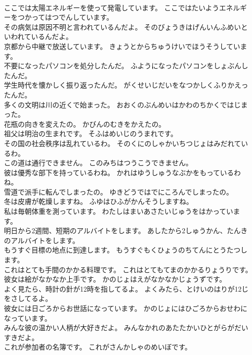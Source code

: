 \documentclass[8pt]{extreport}
\begin{document}
\begin{CJK}{UTF8}{min}
\\	ここでは太陽エネルギーを使って発電しています。	ここではたいようエネルギーをつかってはつでんしています。 
\\	その病気は原因不明と言われているんだよ。	そのびょうきはげんいんふめいといわれているんだよ。 
\\	京都から中継で放送しています。	きょうとからちゅうけいでほうそうしています。 
\\	不要になったパソコンを処分したんだ。	ふようになったパソコンをしょぶんしたんだ。 
\\	学生時代を懐かしく振り返ったんだ。	がくせいじだいをなつかしくふりかえったんだ。 
\\	多くの文明は川の近くで始まった。	おおくのぶんめいはかわのちかくではじまった。 
\\	花瓶の向きを変えたの。	かびんのむきをかえたの。 
\\	祖父は明治の生まれです。	そふはめいじのうまれです。 
\\	その国の社会秩序は乱れているわ。	そのくにのしゃかいちつじょはみだれているわ。 
\\	この道は通行できません。	このみちはつうこうできません。 
\\	彼は優秀な部下を持っているわね。	かれはゆうしゅうなぶかをもっているわね。 
\\	雪道で派手に転んでしまったの。	ゆきどうではでにころんでしまったの。 
\\	冬は皮膚が乾燥しますね。	ふゆはひふがかんそうしますね。 
\\	私は毎朝体重を測っています。	わたしはまいあさたいじゅうをはかっています。 
\\	明日から2週間、短期のアルバイトをします。	あしたから2しゅうかん、たんきのアルバイトをします。 
\\	もうすぐ目標の地点に到達します。	もうすぐもくひょうのちてんにとうたつします。 
\\	これはとても手間のかかる料理です。	これはとてもてまのかかるりょうりです。 
\\	彼女は絵がなかなか上手です。	かのじょはえがなかなかじょうずです。 
\\	よく見たら、時計の針が12時を指してるよ。	よくみたら、とけいのはりが12じをさしてるよ。 
\\	彼女には日ごろからお世話になっています。	かのじょにはひごろからおせわになっています。 
\\	みんな彼の温かい人柄が大好きだよ。	みんなかれのあたたかいひとがらがだいすきだよ。 
\\	これが参加者の名簿です。	これがさんかしゃのめいぼです。 

\end{CJK}
\end{document}
